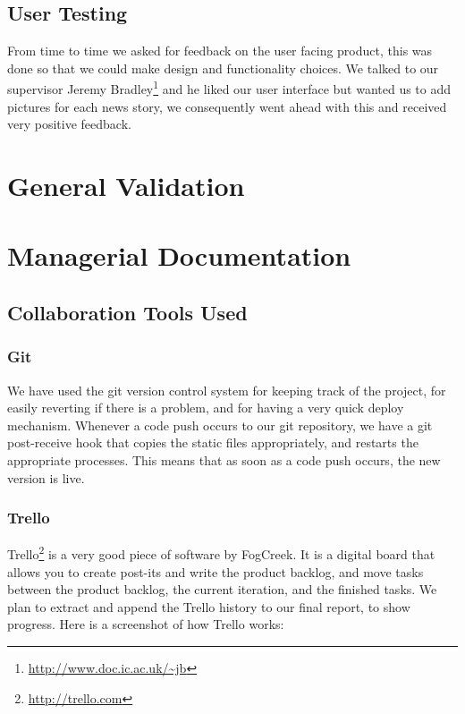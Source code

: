 \documentclass[a4paper,12pt]{article}
\begin{document}
	\subsection{User Testing}
	  From time to time we asked for feedback on the user facing product, this was done so that we could make design and functionality choices. We talked to our supervisor Jeremy Bradley\footnote{\url{http://www.doc.ic.ac.uk/~jb}} and he liked our user interface but wanted us to add pictures for each news story, we consequently went ahead with this and received very positive feedback.
	
	\section{General Validation}
	
	\section{Managerial Documentation}
	
		\subsection{Collaboration Tools Used}
		
			\subsubsection{Git}
			
			We have used the git version control system for keeping track of the project, for easily reverting if there is a problem, and for having a very quick deploy mechanism. Whenever a code push occurs to our git repository, we have a git post-receive hook that copies the static files appropriately, and restarts the appropriate processes. This means that as soon as a code push occurs, the new version is live.
			
			\subsubsection{Trello}
			
			Trello\footnote{\url{http://trello.com}} is a very good piece of software by FogCreek. It is a digital board that allows you to create post-its and write the product backlog, and move tasks between the product backlog, the current iteration, and the finished tasks. We plan to extract and append the Trello history to our final report, to show progress. Here is a screenshot of how Trello works:
			
\end{document}
